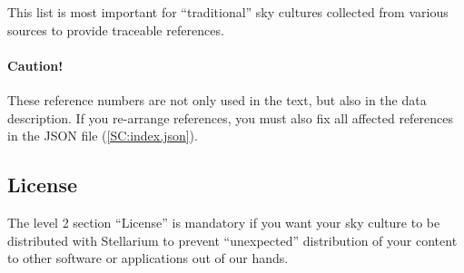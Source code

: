 
This list is most important for ``traditional'' sky cultures collected from various sources to provide traceable references. 

\paragraph{Caution!} These reference numbers are not only used in the text, but also in the data description. If you re-arrange references, 
you must also fix all affected references in the JSON file (\ref{SC:index.json}).


\subsection{License}
\label{sec:skycultures:licenses}
\label{SC:license}

The level 2 section ``License''  is mandatory if you want your sky culture to be distributed with
Stellarium to prevent ``unexpected'' distribution of your content to other
software or applications out of our hands.  
\iffalse
The license info will be decoded for human readable hints about allowed permissions for sky culture in the GUI.
\fi


